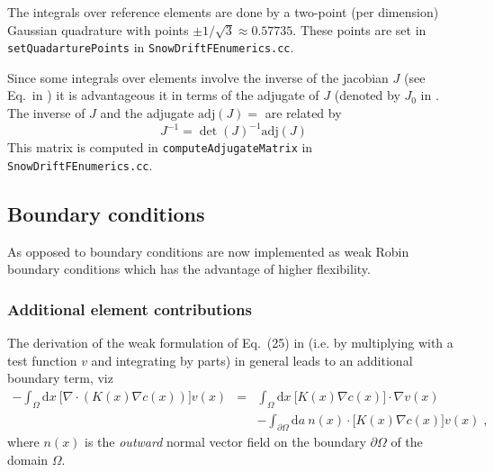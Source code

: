 \documentclass[12pt]{report}
\begin{document}
The integrals over reference elements are done by a two-point (per
dimension) Gaussian quadrature with points $\pm 1/\sqrt{3}\approx
0.57735$. These points are set in \verb+setQuadarturePoints+ in
\verb+SnowDriftFEnumerics.cc+.

Since some integrals over elements involve the inverse of the jacobian
$J$ (see Eq.\ in \cite{ryser_2004}) it is advantageous it in terms of
the adjugate of $J$ (denoted by $J_0$ in \cite{ryser_2004}. The
inverse of $J$ and the adjugate $\mathrm{adj}(J)=$ are related by
\begin{equation}
  J^{-1}=\det(J)^{-1}\mathrm{adj}(J)
\end{equation}
This matrix is computed in \verb+computeAdjugateMatrix+ in
\verb+SnowDriftFEnumerics.cc+.



\subsection{Boundary conditions}
As opposed to \cite{ryser_2004} boundary conditions are now
implemented as weak Robin boundary conditions which has the advantage
of higher flexibility.

\subsubsection{Additional element contributions}
The derivation of the weak formulation of Eq.\ (25) in
\cite{ryser_2004} (i.e. by multiplying with a test function $v$ and
integrating by parts) in general leads to an additional boundary term,
viz
\begin{eqnarray}\label{intbyparts}
  -\int_{\Omega} \mathrm{d}x\ \bigl[ \nabla\cdot(K(x)\nabla c(x)) \bigr] v(x)
  &=&  \int_{\Omega} \mathrm{d}x\ \bigl[K(x)\nabla c(x)\bigr]\cdot\nabla v(x)\\
  &\phantom{=}&-\int_{\partial\Omega} \mathrm{d}a\ n(x)\cdot\bigl[K(x)\nabla c(x)\bigr] v(x)\;,
\end{eqnarray}
where $n(x)$ is the \emph{outward} normal vector field on the boundary
$\partial\Omega$ of the domain $\Omega$.
\end{document}
